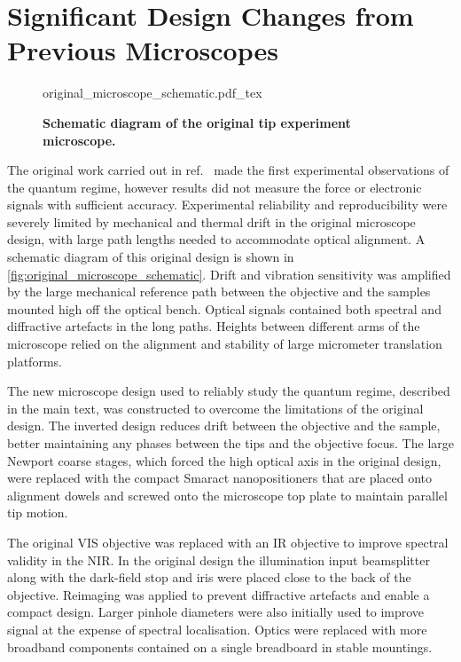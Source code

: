 \documentclass[12pt, a4paper, twoside]{book}
\begin{document}
\chapter{Significant Design Changes from Previous Microscopes}

\begin{figure}[bt]
\centering
\singlespace\fontsize{10pt}{1em}\selectfont
\def\svgwidth{\textwidth}
{original_microscope_schematic.pdf_tex}
\caption[Schematic diagram of the original tip experiment microscope]{\textbf{Schematic diagram of the original tip experiment microscope.}}
\label{fig:original_microscope_schematic}
\end{figure}

The original work carried out in ref.~\cite{savage2012, savage2012thesis} made the first experimental observations of the quantum regime, however results did not measure the force or electronic signals with sufficient accuracy. Experimental reliability and reproducibility were severely limited by mechanical and thermal drift in the original microscope design, with large path lengths needed to accommodate optical alignment. A schematic diagram of this original design is shown in \autoref{fig:original_microscope_schematic}. Drift and vibration sensitivity was amplified by the large mechanical reference path between the objective and the samples mounted high off the optical bench. Optical signals contained both spectral and diffractive artefacts in the long paths. Heights between different arms of the microscope relied on the alignment and stability of large micrometer translation platforms.

The new microscope design used to reliably study the quantum regime, described in the main text, was constructed to overcome the limitations of the original design. The inverted design reduces drift between the objective and the sample, better maintaining any phases between the tips and the objective focus. The large Newport coarse stages, which forced the high optical axis in the original design, were replaced with the compact Smaract nanopositioners that are placed onto alignment dowels and screwed onto the microscope top plate to maintain parallel tip motion.

The original VIS objective was replaced with an IR objective to improve spectral validity in the NIR. In the original design the illumination input beamsplitter along with the dark-field stop and iris were placed close to the back of the objective. Reimaging was applied to prevent diffractive artefacts and enable a compact design. Larger pinhole diameters were also initially used to improve signal at the expense of spectral localisation. Optics were replaced with more broadband components contained on a single breadboard in stable mountings.
\end{document}
